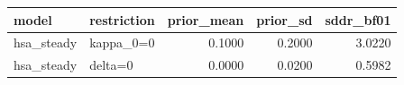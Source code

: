 \begin{tabular}{llrrr}
\toprule
model & restriction & prior\_mean & prior\_sd & sddr\_bf01 \\
\midrule
hsa\_steady & kappa\_0=0 & 0.1000 & 0.2000 & 3.0220 \\
hsa\_steady & delta=0 & 0.0000 & 0.0200 & 0.5982 \\
\bottomrule
\end{tabular}
